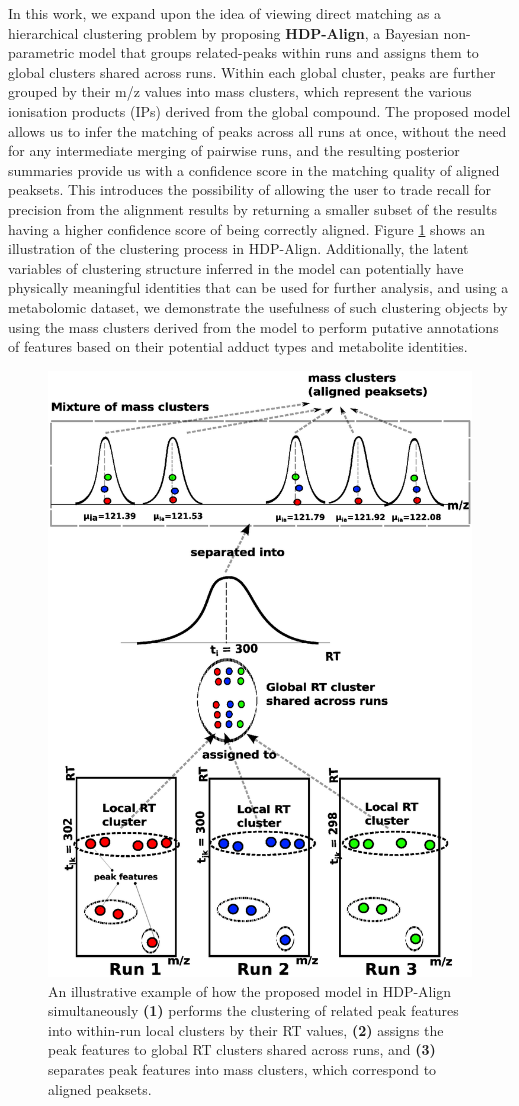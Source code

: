 In this work, we expand upon the idea of viewing direct matching as a hierarchical clustering problem by proposing \textbf{HDP-Align}, a Bayesian non-parametric model that groups related-peaks within runs and assigns them to global clusters shared across runs. Within each global cluster, peaks are further grouped by their m/z values into mass clusters, which represent the various ionisation products (IPs) derived from the global compound. The proposed model allows us to infer the matching of peaks across all runs at once, without the need for any intermediate merging of pairwise runs, and the resulting posterior summaries provide us with a confidence score in the matching quality of aligned peaksets. This introduces the possibility of allowing the user to trade recall for precision from the alignment results by returning a smaller subset of the results having a higher confidence score of being correctly aligned. Figure \ref{fig-hdp-cartoon} shows an illustration of the clustering process in HDP-Align. Additionally, the latent variables of clustering structure inferred in the model can potentially have physically meaningful identities that can be used for further analysis, and using a metabolomic dataset, we demonstrate the usefulness of such clustering objects by using the mass clusters derived from the model to perform putative annotations of features based on their potential adduct types and metabolite identities.

\begin{figure}[!htbp]
\centering\includegraphics[width=0.7\linewidth]{05-hdp/figures/figure_1.eps}
\centering\caption{An illustrative example of how the proposed model in HDP-Align simultaneously \textbf{(1)} performs the clustering of related peak features into within-run local clusters by their RT values, \textbf{(2)} assigns the peak features to global \ac{RT} clusters shared across runs, and \textbf{(3)} separates peak features into mass clusters, which correspond to aligned peaksets.\label{fig-hdp-cartoon}}
\end{figure}

